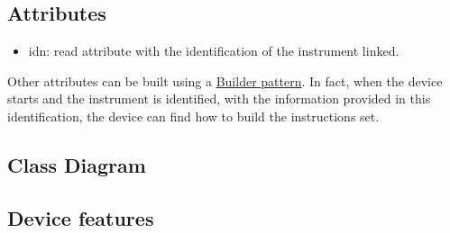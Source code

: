 \documentclass[a4paper,10pt]{article}
\begin{document}
\subsection{Attributes}

\begin{itemize}
    \item idn: read attribute with the identification of the instrument linked.
\end{itemize}

Other attributes can be built using a \href{http://en.wikipedia.org/wiki/Builder_pattern}{Builder pattern}. In fact, when the device starts and the instrument is identified, with the information provided in this identification, the device can find how to build the instructions set.

\subsection{Class Diagram}

\begin{figure}[h]
\end{figure}

\subsection{Device features}
\end{document}
